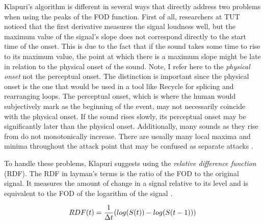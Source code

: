 Klapuri's algorithm is different in several ways that directly address
two problems when using the peaks of the FOD function. First of all,
researchers at TUT noticed that the first derivative measures the
signal loudness well, but the maximum value of the signal's slope does not
correspond directly to the start time of the onset. This is due to the
fact that if the sound takes some time to rise to its maximum value, 
the point at which there is a maximum slope might be late in relation 
to the physical onset of the sound. Note, I refer here to the {\sl
physical onset} not the perceptual onset. The distinction is important
since the physical onset is the one that would be used in a tool like
Recycle{\texttrademark} for splicing and rearranging loops. The
perceptual onset, which is where the human would subjectively mark as the
beginning of the event, may not necessarily coincide with the physical
onset. If the sound rises slowly, its perceptual onset may be
significantly later than the physical onset. Additionally, many sounds
as they rise from do not monotonically increase. There are usually
many local maxima and minima throughout the attack point that may 
be confused as separate attacks \cite{Klapuri:99}.

To handle these problems, Klapuri suggests using the {\sl relative
difference function} (RDF). The RDF in layman's terms is the ratio of the FOD 
to the original signal. It measures the amount of change in
a signal relative to its level and is equivalent to the FOD of the 
logarithm of the signal \cite{Klapuri:99}. 

\begin{equation}
RDF(t) = {1 \over \Delta t}(log(S(t)) - log(S(t-1)))
\label{RDF}
\end{equation}

